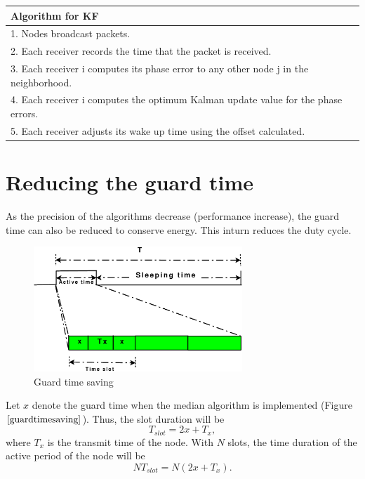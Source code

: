 \documentclass[a4paper,10pt]{report}
\begin{document}
\newline  \newline
\begin{tabular}{  l }Algorithm for KF \\ \hline
1. Nodes broadcast packets. \\  2. Each receiver records the time that the packet is received. \\
3. Each receiver i computes its phase error to any other node j in the neighborhood. \\
4. Each receiver i computes the optimum Kalman update value for the phase errors. \\
5. Each receiver adjusts its wake up time using the offset calculated.\\
\hline
\end{tabular}
\section{\textbf{Reducing the guard time}}
As the precision of the algorithms decrease (performance increase), the guard time can also be reduced to conserve energy. This inturn
reduces the duty cycle.
\begin{figure}
\centering
\includegraphics[width=0.7\textwidth]{guardtimesaving}
\caption{Guard time saving} \label{guardtimesaving}
\end{figure}
\newline Let $x$ denote the guard time when the median algorithm is implemented (Figure $\ref{guardtimesaving}$). Thus, the slot
duration will be 
\begin{equation}
T_{slot}=2x + T_x ,
\end{equation}
where $T_x$ is the transmit time of the node. \newline With $N$ slots, the time duration of the active period of the node will be
\begin{equation}
NT_{slot}=N(2x + T_x). \label{slot}
\end{equation}
\end{document}
